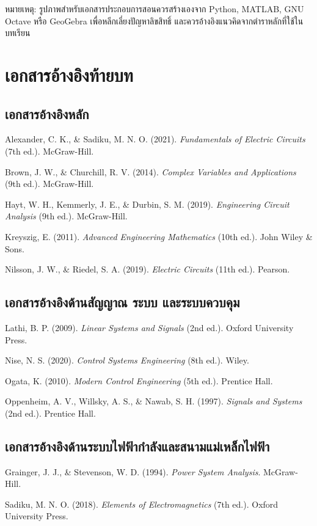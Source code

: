 หมายเหตุ: รูปภาพสำหรับเอกสารประกอบการสอนควรสร้างเองจาก Python, MATLAB, GNU Octave หรือ GeoGebra เพื่อหลีกเลี่ยงปัญหาลิขสิทธิ์ และควรอ้างอิงแนวคิดจากตำราหลักที่ใช้ในบทเรียน

\section{เอกสารอ้างอิงท้ายบท}

\subsection*{เอกสารอ้างอิงหลัก}

Alexander, C. K., \& Sadiku, M. N. O. (2021). \textit{Fundamentals of Electric Circuits} (7th ed.). McGraw-Hill.

Brown, J. W., \& Churchill, R. V. (2014). \textit{Complex Variables and Applications} (9th ed.). McGraw-Hill.

Hayt, W. H., Kemmerly, J. E., \& Durbin, S. M. (2019). \textit{Engineering Circuit Analysis} (9th ed.). McGraw-Hill.

Kreyszig, E. (2011). \textit{Advanced Engineering Mathematics} (10th ed.). John Wiley \& Sons.

Nilsson, J. W., \& Riedel, S. A. (2019). \textit{Electric Circuits} (11th ed.). Pearson.

\subsection*{เอกสารอ้างอิงด้านสัญญาณ ระบบ และระบบควบคุม}

Lathi, B. P. (2009). \textit{Linear Systems and Signals} (2nd ed.). Oxford University Press.

Nise, N. S. (2020). \textit{Control Systems Engineering} (8th ed.). Wiley.

Ogata, K. (2010). \textit{Modern Control Engineering} (5th ed.). Prentice Hall.

Oppenheim, A. V., Willsky, A. S., \& Nawab, S. H. (1997). \textit{Signals and Systems} (2nd ed.). Prentice Hall.

\subsection*{เอกสารอ้างอิงด้านระบบไฟฟ้ากำลังและสนามแม่เหล็กไฟฟ้า}

Grainger, J. J., \& Stevenson, W. D. (1994). \textit{Power System Analysis}. McGraw-Hill.

Sadiku, M. N. O. (2018). \textit{Elements of Electromagnetics} (7th ed.). Oxford University Press.

